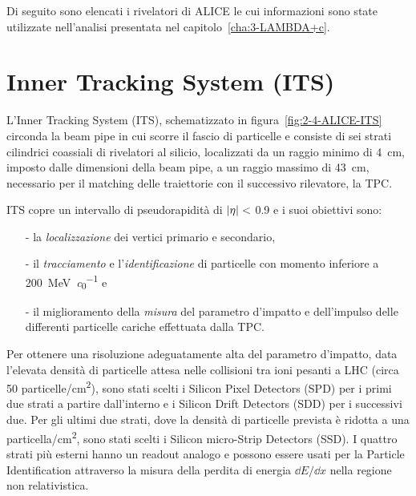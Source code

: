         Di seguito sono elencati i rivelatori di ALICE le cui informazioni sono state utilizzate nell’analisi presentata nel capitolo~\ref{cha:3-LAMBDA+c}.

\section{Inner Tracking System (ITS)}
    L’Inner Tracking System (ITS), schematizzato in figura~\ref{fig:2-4-ALICE-ITS} circonda la beam pipe in cui scorre il fascio di particelle e consiste di sei strati cilindrici coassiali di rivelatori al silicio, localizzati da un raggio minimo di \qty{4}{\centi \meter}, imposto dalle dimensioni della beam pipe, a un raggio massimo di \qty{43}{\centi \meter}, necessario per il matching delle traiettorie con il successivo rilevatore, la TPC.
    
    ITS copre un intervallo di pseudorapidità di $\abs{\eta} <$ \num{0.9} e i suoi obiettivi sono:
    \begin{itemize}
        \item[-] la \textit{localizzazione} dei vertici primario e secondario,

        \item[-] il \textit{tracciamento} e l’\textit{identificazione} di particelle con momento inferiore a \qty[per-mode = symbol]{200}{\mega \eV \per \clight} e

        \item[-] il miglioramento della \textit{misura} del parametro d’impatto e dell’impulso delle differenti particelle cariche effettuata dalla TPC.
    \end{itemize}
    
    Per ottenere una risoluzione adeguatamente alta del parametro d’impatto, data l’elevata densità di particelle attesa nelle collisioni tra ioni pesanti a LHC (circa \num{50} particelle/\unit{\centi \meter^2}), sono stati scelti i Silicon Pixel Detectors (SPD) per i primi due strati a partire dall’interno e i Silicon Drift Detectors (SDD) per i successivi due. Per gli ultimi due strati, dove la densità di particelle prevista è ridotta a una particella/\unit{\centi \meter^2}, sono stati scelti i Silicon micro-Strip Detectors (SSD). I quattro strati più esterni hanno un readout analogo e possono essere usati per la Particle Identification attraverso la misura della perdita di energia $\dd{E}/\dd{x}$ nella regione non relativistica.

